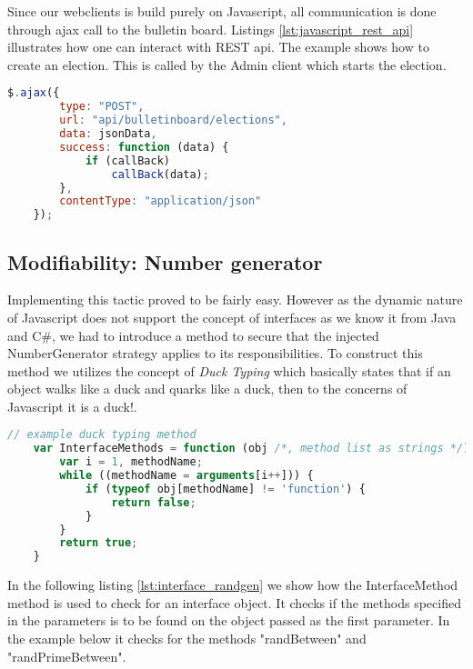 \noindent
Since our webclients is build purely on Javascript, all communication is done through ajax call to the bulletin board. Listings \ref{lst:javascript_rest_api} illustrates how one can interact with REST api. The example shows how to create an election. This is called by the Admin client which starts the election.   \\ 


\begin{lstlisting}[language=Javascript, caption=Javascript example, label=lst:javascript_rest_api]
    $.ajax({
        type: "POST",
        url: "api/bulletinboard/elections",
        data: jsonData,
        success: function (data) {
            if (callBack)
                callBack(data);
        },
        contentType: "application/json"
    });
\end{lstlisting}


 
\subsection{Modifiability: Number generator}
Implementing this tactic proved to be fairly easy. However as the dynamic nature of Javascript does not support the concept
of interfaces as we know it from Java and C\#, we had to introduce a method to secure that the injected NumberGenerator strategy
applies to its responsibilities. To construct this method we utilizes the concept of \textit{Duck Typing} which basically states that
if an object walks like a duck and quarks like a duck, then to the concerns of Javascript it is a duck!. 

\begin{lstlisting}[language=Javascript, caption=Implementation of Duck typing, label=lst:ducktyping]
    // example duck typing method
    var InterfaceMethods = function (obj /*, method list as strings */) {
        var i = 1, methodName;
        while ((methodName = arguments[i++])) {
            if (typeof obj[methodName] != 'function') {
                return false;
            }
        }
        return true;
    }
\end{lstlisting}

\noindent
In the following listing \ref{lst:interface_randgen} we show how the InterfaceMethod method is used to check
for an interface object. It checks if the methods specified in the parameters is to be found on the object passed as the 
first parameter. In the example below it checks for the methods "randBetween" and "randPrimeBetween".

